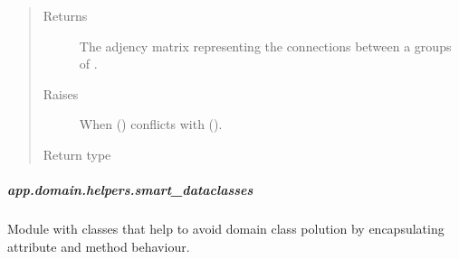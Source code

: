 \documentclass[letterpaper,10pt,english]{sphinxmanual}
\begin{document}
\begin{fulllineitems}
\begin{quote}
\begin{description}
\begin{itemize}
\end{itemize}

\item[{Returns}] \leavevmode
The adjency matrix representing the connections between a
groups of {\hyperref[\detokenize{app.domain:app.domain.network_nodes.Node}]{}}.

\item[{Raises}] \leavevmode
{\hyperref[\detokenize{app.domain.helpers:app.domain.helpers.exceptions.IllegalArgumentError}]{}} \textendash{} When  () conflicts with
     ().

\item[{Return type}] \leavevmode
{}

\end{description}\end{quote}

\end{fulllineitems}



\subparagraph{app.domain.helpers.smart\_dataclasses}
\label{\detokenize{app.domain.helpers:module-app.domain.helpers.smart_dataclasses}}\label{\detokenize{app.domain.helpers:app-domain-helpers-smart-dataclasses}}
Module with classes that help to avoid domain class polution by
encapsulating attribute and method behaviour.
\end{document}
